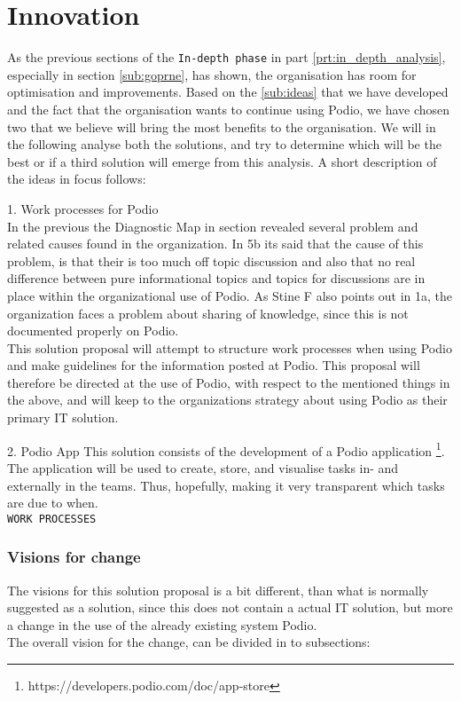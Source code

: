 \part{Innovation}
As the previous sections of the \texttt{In-depth phase} in part \ref{prt:in_depth_analysis},
especially in section \ref{sub:goprne}, has shown,
the organisation has room for optimisation and improvements. Based on the \ref{sub:ideas} that we
have developed and the fact that the organisation wants to continue using Podio, we have chosen two that we believe will bring the most benefits to the organisation.
We will in the following analyse both the solutions, and try to determine which will be the best or
if a third solution will emerge from this analysis. A short description of the ideas in focus
follows:


1. Work processes for Podio\\
In the previous the Diagnostic Map in section revealed several problem and related causes found in the organization. In 5b its said that the cause of this problem, is that their is too much off topic discussion and also that no real difference between pure informational topics and topics for discussions are in place within the organizational use of Podio. As Stine F also points out in 1a, the organization faces a problem about sharing of knowledge, since this is not documented properly on Podio.\\

This solution proposal will attempt to structure work processes when using Podio and make guidelines for the information posted at Podio. This proposal will therefore be directed at the use of Podio, with respect to the mentioned things in the above, and will keep to the organizations strategy about using Podio as their primary IT solution. 

2. Podio App
This solution consists of the development of a Podio application \footnote{https://developers.podio.com/doc/app-store}.
The application will be used to create, store, and visualise tasks in- and externally in the teams.
Thus, hopefully, making it very transparent which tasks are due to when.\\

\texttt{WORK PROCESSES}
\section{Visions for change}
The visions for this solution proposal is a bit different, than what is normally suggested as a solution, since this does not contain a actual IT solution, but more a change in the use of the already existing system Podio.\\
The overall vision for the change, can be divided in to subsections:\\
